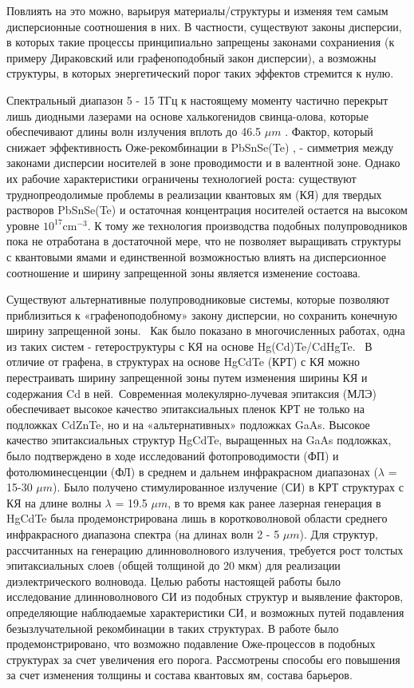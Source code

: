 \documentclass[../main.tex]{subfiles}
\begin{document}
Повлиять на это можно, варьируя материалы/структуры и изменяя тем самым дисперсионные соотношения в них. В частности,
существуют законы дисперсии, в которых такие процессы принципиально запрещены законами сохраниения (к примеру Дираковский 
или графеноподобный закон дисперсии), а возможны структуры, в которых энергетический порог таких эффектов стремится к нулю.

Спектральный диапазон 5 - 15 ТГц к настоящему моменту частично 
перекрыт лишь диодными лазерами на основе халькогенидов свинца-олова, которые обеспечивают длины 
волн излучения вплоть до 46.5 $\mu m$ \cite{Intro8}. Фактор, который снижает эффективность Оже-рекомбинации в PbSnSe(Te) \cite{Intro1}, \cite{Intro9}
- симметрия между законами дисперсии носителей в зоне проводимости и в валентной зоне. Однако их рабочие характеристики 
ограничены технологией роста: существуют труднопреодолимые проблемы в реализации квантовых ям (КЯ) для твердых растворов 
PbSnSe(Te) и остаточная концентрация носителей остается на высоком уровне $10^17 \text{cm}^{-3}$. К тому же технология производства подобных
полупроводников пока не отработана в достаточной мере, что не позволяет выращивать структуры с квантовыми ямами и единственной возможностью
влиять на дисперсионное соотношение и ширину запрещенной зоны является изменение состоава.

Существуют альтернативные полупроводниковые системы, которые позволяют
приблизиться к «графеноподобному» закону дисперсии, но сохранить конечную ширину запрещенной зоны. 
Как было показано в многочисленных работах, одна из таких систем - гетероструктуры с КЯ на основе Hg(Cd)Te/CdHgTe. 
В отличие от графена, в структурах на основе HgCdTe (КРТ) с КЯ можно перестраивать ширину запрещенной зоны путем изменения ширины КЯ и 
содержания Cd в ней. Современная молекулярно-лучевая эпитаксия (МЛЭ) обеспечивает высокое качество эпитаксиальных пленок КРТ не только на подложках CdZnTe, 
но и на «альтернативных» подложках GaAs. Высокое качество эпитаксиальных структур HgCdTe, выращенных на GaAs подложках, было подтверждено в ходе исследований 
фотопроводимости (ФП) и фотолюминесценции (ФЛ) в среднем и дальнем инфракрасном диапазонах ($λ$ = 15-30 $\mu m$). Было получено 
стимулированное излучение (СИ) в КРТ структурах с КЯ на длине волны $λ$ = 19.5 $\mu m$, в то время как ранее лазерная генерация в HgCdTe была 
продемонстрирована лишь в коротковолновой области среднего инфракрасного диапазона спектра (на длинах волн 2 - 5 $\mu m$). 
Для структур, рассчитанных на генерацию длинноволнового излучения, требуется рост толстых эпитаксиальных слоев (общей толщиной до 20 мкм) для реализации диэлектрического волновода. 
Целью работы настоящей работы было исследование длинноволнового СИ из подобных структур и выявление факторов, определяющие наблюдаемые характеристики СИ, и возможных путей подавления 
безызлучательной рекомбинации в таких структурах. В работе было продемонстрировано, что возможно подавление Оже-процессов в подобных структурах за счет увеличения его порога. Рассмотрены 
способы его повышения за счет изменения толщины и состава квантовых ям, состава барьеров.
\end{document}
